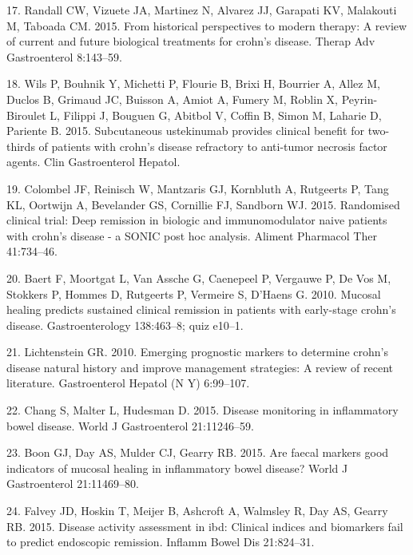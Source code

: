 \documentclass[12pt,]{article}
\begin{document}
\hypertarget{ref-randall_CDbiologics_2015}{}
17. Randall CW, Vizuete JA, Martinez N, Alvarez JJ, Garapati KV,
Malakouti M, Taboada CM. 2015. From historical perspectives to modern
therapy: A review of current and future biological treatments for
crohn's disease. Therap Adv Gastroenterol 8:143--59.

\hypertarget{ref-wils_ust_2015}{}
18. Wils P, Bouhnik Y, Michetti P, Flourie B, Brixi H, Bourrier A, Allez
M, Duclos B, Grimaud JC, Buisson A, Amiot A, Fumery M, Roblin X,
Peyrin-Biroulet L, Filippi J, Bouguen G, Abitbol V, Coffin B, Simon M,
Laharie D, Pariente B. 2015. Subcutaneous ustekinumab provides clinical
benefit for two-thirds of patients with crohn's disease refractory to
anti-tumor necrosis factor agents. Clin Gastroenterol Hepatol.

\hypertarget{ref-colombel_deepremission_2015}{}
19. Colombel JF, Reinisch W, Mantzaris GJ, Kornbluth A, Rutgeerts P,
Tang KL, Oortwijn A, Bevelander GS, Cornillie FJ, Sandborn WJ. 2015.
Randomised clinical trial: Deep remission in biologic and
immunomodulator naive patients with crohn's disease - a SONIC post hoc
analysis. Aliment Pharmacol Ther 41:734--46.

\hypertarget{ref-baert_mucosalhealing_2010}{}
20. Baert F, Moortgat L, Van Assche G, Caenepeel P, Vergauwe P, De Vos
M, Stokkers P, Hommes D, Rutgeerts P, Vermeire S, D'Haens G. 2010.
Mucosal healing predicts sustained clinical remission in patients with
early-stage crohn's disease. Gastroenterology 138:463--8; quiz e10--1.

\hypertarget{ref-Lichtenstein_biomarkers_2010}{}
21. Lichtenstein GR. 2010. Emerging prognostic markers to determine
crohn's disease natural history and improve management strategies: A
review of recent literature. Gastroenterol Hepatol (N Y) 6:99--107.

\hypertarget{ref-Chang_biomarkers_2015}{}
22. Chang S, Malter L, Hudesman D. 2015. Disease monitoring in
inflammatory bowel disease. World J Gastroenterol 21:11246--59.

\hypertarget{ref-Boon_biomarkers_2015}{}
23. Boon GJ, Day AS, Mulder CJ, Gearry RB. 2015. Are faecal markers good
indicators of mucosal healing in inflammatory bowel disease? World J
Gastroenterol 21:11469--80.

\hypertarget{ref-Falvey_biomarkers_2015}{}
24. Falvey JD, Hoskin T, Meijer B, Ashcroft A, Walmsley R, Day AS,
Gearry RB. 2015. Disease activity assessment in ibd: Clinical indices
and biomarkers fail to predict endoscopic remission. Inflamm Bowel Dis
21:824--31.
\end{document}
